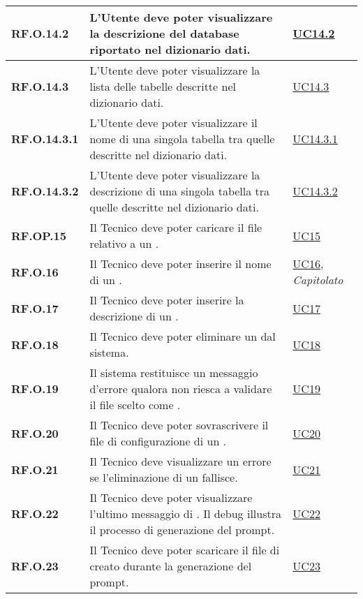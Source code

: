 \begin{longtable}{|P{3cm}|P{6,5cm}|>{\arraybackslash}P{4cm}|}
    \hline
    \textbf{RF.O.14.2} & L'Utente deve poter visualizzare la descrizione del database riportato nel dizionario dati. & \hyperref[UC14point2]{UC14.2}\\
    \hline
    \textbf{RF.O.14.3} & L'Utente deve poter visualizzare la lista delle tabelle descritte nel dizionario dati. & \hyperref[UC14point3]{UC14.3}\\
    \hline
    \textbf{RF.O.14.3.1} & L'Utente deve poter visualizzare il nome di una singola tabella tra quelle descritte nel dizionario dati. & \hyperref[UC14point3point1]{UC14.3.1}\\
    \hline
    \textbf{RF.O.14.3.2} & L'Utente deve poter visualizzare la descrizione di una singola tabella tra quelle descritte nel dizionario dati. & \hyperref[UC14point3point2]{UC14.3.2}\\
    \hline
    \textbf{RF.OP.15} & Il Tecnico deve poter caricare il file relativo a un . & \hyperref[UC15]{UC15}\\
    \hline
    \textbf{RF.O.16} & Il Tecnico deve poter inserire il nome di un . & \hyperref[UC16]{UC16}, \emph{Capitolato}\\
    \hline
    \textbf{RF.O.17} & Il Tecnico deve poter inserire la descrizione di un . & \hyperref[UC17]{UC17}\\
    \hline
    \textbf{RF.O.18} & Il Tecnico deve poter eliminare un  dal sistema. & \hyperref[UC18]{UC18}\\
    \hline
    \textbf{RF.O.19} & Il sistema restituisce un messaggio d'errore qualora non riesca a validare il file scelto come . & \hyperref[UC19]{UC19} \\
    \hline 
    \textbf{RF.O.20} & Il Tecnico deve poter sovrascrivere il file di configurazione di un . & \hyperref[UC20]{UC20} \\
    \hline
    \textbf{RF.O.21} & Il Tecnico deve visualizzare un errore se l'eliminazione di un  fallisce. & \hyperref[21]{UC21}\\
    \hline
    \textbf{RF.O.22} & Il Tecnico deve poter visualizzare l'ultimo messaggio di . Il debug illustra il processo di generazione del prompt. & \hyperref[22]{UC22}\\
    \hline
    \textbf{RF.O.23} & Il Tecnico deve poter scaricare il file di  creato durante la generazione del prompt. & \hyperref[23]{UC23}\\

\end{longtable}
